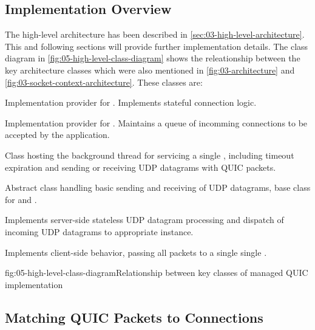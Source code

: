 \subsection{Implementation Overview}

The high-level architecture has been described in \autoref{sec:03-high-level-architecture}. This and
following sections will provide further implementation details. The class diagram in
\autoref{fig:05-high-level-class-diagram} shows the releationship between the key architecture
classes which were also mentioned in \autoref{fig:03-architecture} and
\autoref{fig:03-socket-context-architecture}. These classes are:

\begin{itemize}

  \litem[]{\ManagedQuicConnection{}} Implementation provider for \QuicConnection{}. Implements stateful connection logic.

  \litem[]{\ManagedQuicListener{}} Implementation provider for \QuicListener{}. Maintains a queue of incomming connections to be accepted by the application.

  \litem[]{\QuicConnectionContext{}} Class hosting the background thread for servicing a single \ManagedQuicConnection{}, including timeout expiration and sending or receiving UDP datagrams with QUIC packets.

  \litem[]{\QuicSocketContext{}} Abstract class handling basic sending and receiving of UDP datagrams, base class for \QuicClientSocketContext{} and \QuicServerSocketContext{}.

  \litem[]{\QuicServerSocketContext{}} Implements server-side stateless UDP datagram processing and dispatch of incoming UDP datagrams to appropriate \QuicConnectionContext{} instance.

  \litem[]{\QuicClientSocketContext{}} Implements client-side \QuicSocketContext{} behavior, passing all packets to a single single \QuicConnectionContext{}.

\end{itemize}

\begin{myFigure}{fig:05-high-level-class-diagram}{Relationship between key classes of managed QUIC implementation}

\resizebox{0.87\linewidth}{!}{}

\end{myFigure}

\subsection{Matching QUIC Packets to Connections}



